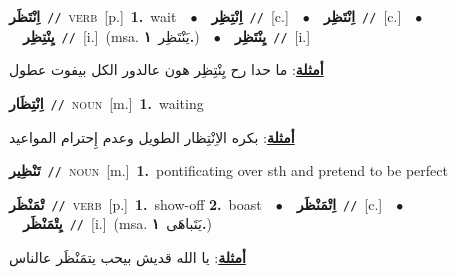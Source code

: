 \documentclass[10pt,a4paper,twoside]{article} %
\begin{document}
\begin{multicols}{2}
{\setlength\topsep{0pt}\textbf{\foreignlanguage{arabic}{اِنْتَظَر}}\ {\color{gray}\texttt{//}\color{black}}\ \textsc{verb}\ [p.]\ \textbf{1.}~wait\ \ $\bullet$\ \ \setlength\topsep{0pt}\textbf{\foreignlanguage{arabic}{اِنْتِظِر}}\ {\color{gray}\texttt{//}\color{black}}\ [c.]\ \ $\bullet$\ \ \setlength\topsep{0pt}\textbf{\foreignlanguage{arabic}{اِنْتَظِر}}\ {\color{gray}\texttt{//}\color{black}}\ [c.]\ \ $\bullet$\ \ \setlength\topsep{0pt}\textbf{\foreignlanguage{arabic}{يِنْتِظِر}}\ {\color{gray}\texttt{//}\color{black}}\ [i.]\ \color{gray}(msa. \foreignlanguage{arabic}{يَنْتَظِر}~\foreignlanguage{arabic}{\textbf{١.}})\color{black}\ \ $\bullet$\ \ \setlength\topsep{0pt}\textbf{\foreignlanguage{arabic}{يِنْتَظِر}}\ {\color{gray}\texttt{//}\color{black}}\ [i.]\  \begin{flushright}\color{gray}\foreignlanguage{arabic}{\textbf{\underline{\foreignlanguage{arabic}{أمثلة}}}: ما حدا رح يِنْتِظِر هون عالدور الكل بيفوت عطول}\end{flushright}\color{black}} \vspace{2mm}

{\setlength\topsep{0pt}\textbf{\foreignlanguage{arabic}{اِنْتِظَار}}\ {\color{gray}\texttt{//}\color{black}}\ \textsc{noun}\ [m.]\ \textbf{1.}~waiting\  \begin{flushright}\color{gray}\foreignlanguage{arabic}{\textbf{\underline{\foreignlanguage{arabic}{أمثلة}}}: بكره الاِنْتِظار الطويل وعدم إِحترام المواعيد}\end{flushright}\color{black}} \vspace{2mm}

{\setlength\topsep{0pt}\textbf{\foreignlanguage{arabic}{تَنْظِير}}\ {\color{gray}\texttt{//}\color{black}}\ \textsc{noun}\ [m.]\ \textbf{1.}~pontificating over sth and pretend to be perfect\ } \vspace{2mm}

{\setlength\topsep{0pt}\textbf{\foreignlanguage{arabic}{تْمَنْظَر}}\ {\color{gray}\texttt{//}\color{black}}\ \textsc{verb}\ [p.]\ \textbf{1.}~show-off  \textbf{2.}~boast\ \ $\bullet$\ \ \setlength\topsep{0pt}\textbf{\foreignlanguage{arabic}{اِتْمَنْظَر}}\ {\color{gray}\texttt{//}\color{black}}\ [c.]\ \ $\bullet$\ \ \setlength\topsep{0pt}\textbf{\foreignlanguage{arabic}{يِتْمَنْظَر}}\ {\color{gray}\texttt{//}\color{black}}\ [i.]\ \color{gray}(msa. \foreignlanguage{arabic}{يَتَباهَى}~\foreignlanguage{arabic}{\textbf{١.}})\color{black}\  \begin{flushright}\color{gray}\foreignlanguage{arabic}{\textbf{\underline{\foreignlanguage{arabic}{أمثلة}}}: يا الله قديش بيحب يتمَنْظَر عالناس}\end{flushright}\color{black}} \vspace{2mm}


\end{multicols}
\end{document}
